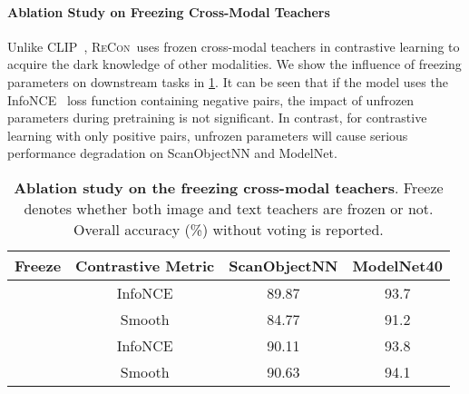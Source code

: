 \documentclass{article}
\theoremstyle{plain}
\theoremstyle{definition}
\theoremstyle{remark}
\def\recon{{\scshape ReCon}}
\begin{document}
\paragraph{Ablation Study on Freezing Cross-Modal Teachers}
Unlike CLIP~\citep{CLIP}, \recon\ uses frozen cross-modal teachers in contrastive learning to acquire the dark knowledge of other modalities. We show the influence of freezing parameters on downstream tasks in \cref{tab:freeze_ablation}. It can be seen that if the model uses the InfoNCE~\citep{InfoNCE} loss function containing negative pairs, the impact of unfrozen parameters during pretraining is not significant. In contrast, for contrastive learning with only positive pairs, unfrozen parameters will cause serious performance degradation on ScanObjectNN and ModelNet.
\begin{table}[!h]
\caption{
\textbf{Ablation study on the freezing cross-modal teachers}. Freeze denotes whether both image and text teachers are frozen or not. Overall accuracy (\%) without voting is reported.} \label{tab:freeze_ablation}
\begin{center}
\begin{tabular}{cccc}
\toprule[0.95pt]
Freeze & Contrastive Metric & ScanObjectNN & ModelNet40\\
\midrule[0.6pt]
 & InfoNCE  & 89.87 & 93.7\\
 & Smooth  & 84.77 & 91.2\\
\midrule[0.6pt]
 & InfoNCE & 90.11 & 93.8\\
 & Smooth  & 90.63 & 94.1\\
\bottomrule[0.95pt]
\end{tabular}
\end{center}
\end{table} 
\end{document}
